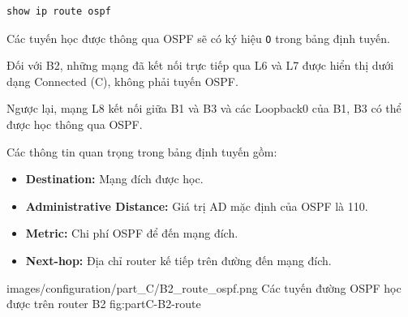 \begin{lstlisting}
show ip route ospf
\end{lstlisting}

Các tuyến học được thông qua
OSPF sẽ có ký hiệu \texttt{O}
trong bảng định tuyến.

Đối với B2, những mạng đã kết nối
trực tiếp qua L6 và L7 được hiển thị
dưới dạng Connected (C),
không phải tuyến OSPF.

Ngược lại, mạng L8 kết nối
giữa B1 và B3 và các Loopback0
của B1, B3 có thể được học
thông qua OSPF.

Các thông tin quan trọng
trong bảng định tuyến gồm:

\begin{itemize}
    \item \textbf{Destination:}
    Mạng đích được học.

    \item \textbf{Administrative Distance:}
    Giá trị AD mặc định của OSPF
    là 110.

    \item \textbf{Metric:}
    Chi phí OSPF để đến mạng đích.

    \item \textbf{Next-hop:}
    Địa chỉ router kế tiếp
    trên đường đến mạng đích.
\end{itemize}

\partzeroimage
{images/configuration/part_C/B2_route_ospf.png}
{Các tuyến đường OSPF học được trên router B2}
{fig:partC-B2-route}

\newpage
